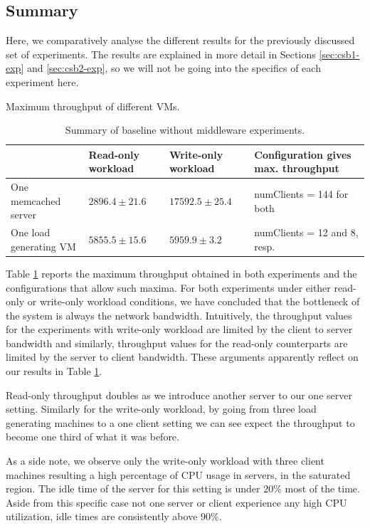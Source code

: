 \documentclass[11pt,a4paper]{article}
\begin{document}
\subsection{Summary} \label{sec:csb-summary}
Here, we comparatively analyse the different results for the previously discussed set of experiments. The results are explained in more detail in Sections \ref{sec:csb1-exp} and \ref{sec:csb2-exp}, so we will not be going into the specifics of each experiment here.
\begin{table}[h]
\centering
{Maximum throughput of different VMs.}
\begin{tabular}{|l|p{2.5cm}|p{2.5cm}|p{5cm}|}
\hline 	                      & Read-only workload & Write-only workload & Configuration gives max. throughput \\ 
\hline One memcached server   & $2896.4 \pm 21.6$ & $17592.5 \pm 25.4$ & numClients = 144 for both    \\ 
\hline One load generating VM & $5855.5 \pm 15.6$ & $5959.9 \pm 3.2$   & numClients = 12 and 8, resp. \\ 
\hline 
\end{tabular}
\caption{Summary of baseline without middleware experiments.} \label{tab:csb-summary}
\end{table}
\par Table \ref{tab:csb-summary} reports the maximum throughput obtained in both experiments and the configurations that allow such maxima. For both experiments under either read-only or write-only workload conditions, we have concluded that the bottleneck of the system is always the network bandwidth. Intuitively, the throughput values for the experiments with write-only workload are limited by the client to server bandwidth and similarly, throughput values for the read-only counterparts are limited by the server to client bandwidth. These arguments apparently reflect on our results in Table \ref{tab:csb-summary}.
\par Read-only throughput doubles as we introduce another server to our one server setting. Similarly for the write-only workload, by going from three load generating machines to a one client setting we can see expect the throughput to become one third of what it was before.
\par As a side note, we observe only the write-only workload with three client machines resulting a high percentage of CPU usage in servers, in the saturated region. The idle time of the server for this setting is under $20\%$ most of the time. Aside from this specific case not one server or client experience any high CPU utilization, idle times are consistently above $90\%$.
\end{document}
